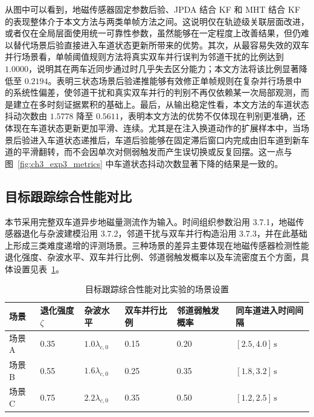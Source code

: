 \documentclass{xdupgthesis}
\begin{document}
从图中可以看到，地磁传感器固定参数后验、JPDA 结合 KF 和 MHT 结合 KF 的表现整体介于本文方法与两类单帧方法之间。这说明仅在轨迹级关联层面改进，或者仅在全局层面使用统一可靠性参数，虽然能够在一定程度上改善结果，但仍难以替代场景后验直接进入车道状态更新所带来的优势。其次，从最容易失效的双车并行场景看，单帧阈值规则方法将真实双车并行误判为邻道干扰的比例达到 $1.0000$，说明其在两车近同步通过时几乎失去区分能力；本文方法将该比例显著降低至 $0.2194$。表明三状态场景后验递推能够有效修正单帧规则在复杂并行场景中的系统性偏差，使邻道干扰和真实双车并行的判别不再仅依赖某一次局部观测，而是建立在多时刻证据累积的基础上。最后，从输出稳定性看，本文方法的车道状态抖动次数由 $1.5778$ 降至 $0.5611$，表明本文方法的优势不仅体现在判别更准确，还体现在车道状态更新更加平滑、连续。尤其是在注入换道动作的扩展样本中，当场景后验进入车道状态递推后，车道后验能够在固定滞后窗口内完成由旧车道到新车道的平滑翻转，而不会因单次对侧弱触发而产生误切换或反复回摆。这一点与图~\ref{fig:ch3_exp3_metrics} 中车道状态抖动次数显著下降的结果是一致的。



\subsection{目标跟踪综合性能对比}

本节采用完整双车道异步地磁量测流作为输入。时间组织参数沿用 3.7.1，地磁传感器退化与杂波建模沿用 3.7.2，邻道干扰与双车并行构造沿用 3.7.3，并在此基础上形成三类难度递增的评测场景。三种场景的差异主要体现在地磁传感器检测性能退化强度、杂波水平、双车并行比例、邻道弱触发概率以及车流密度五个方面，具体设置见表~\ref{tab:ch3_tracking_scene_setup}。

\begin{table}[htbp]
	\centering
	\caption{目标跟踪综合性能对比实验的场景设置}
	\label{tab:ch3_tracking_scene_setup}
	\small
	\begin{tabular}{p{1.8cm}p{2.2cm}p{2.0cm}p{2.0cm}p{2.2cm}p{2.3cm}}
		\toprule
		场景 & 退化强度 $\zeta$ & 杂波水平 & 双车并行比例 & 邻道弱触发概率 & 同车道进入时间间隔 \\
		\midrule
		场景 A & 0.35 & $1.0\lambda_{c,0}$ & 0.15 & 0.20 & $[2.5,4.0]\,\mathrm{s}$ \\
		场景 B & 0.55 & $1.6\lambda_{c,0}$ & 0.25 & 0.35 & $[1.8,3.2]\,\mathrm{s}$ \\
		场景 C & 0.75 & $2.2\lambda_{c,0}$ & 0.35 & 0.50 & $[1.2,2.5]\,\mathrm{s}$ \\
		\bottomrule
	\end{tabular}
\end{table}
\end{document}
